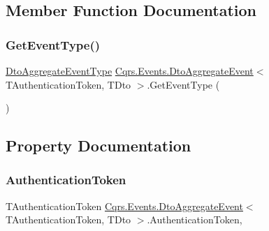 \subsection{Member Function Documentation}
\mbox{\label{classCqrs_1_1Events_1_1DtoAggregateEvent_af5bed152d656cb758312f499f87e69de_af5bed152d656cb758312f499f87e69de}} 
\subsubsection{\texorpdfstring{Get\+Event\+Type()}{GetEventType()}}
{\footnotesize\ttfamily \hyperlink{namespaceCqrs_1_1Events_a2a32e13adeac92f5a93966cd8ee2d39a_a2a32e13adeac92f5a93966cd8ee2d39a}{Dto\+Aggregate\+Event\+Type} \hyperlink{classCqrs_1_1Events_1_1DtoAggregateEvent}{Cqrs.\+Events.\+Dto\+Aggregate\+Event}$<$ T\+Authentication\+Token, T\+Dto $>$.Get\+Event\+Type (\begin{DoxyParamCaption}{ }\end{DoxyParamCaption})}



\subsection{Property Documentation}
\mbox{\label{classCqrs_1_1Events_1_1DtoAggregateEvent_a536e92af26632a9590e2ed590232cfcf_a536e92af26632a9590e2ed590232cfcf}} 
\subsubsection{\texorpdfstring{Authentication\+Token}{AuthenticationToken}}
{\footnotesize\ttfamily T\+Authentication\+Token \hyperlink{classCqrs_1_1Events_1_1DtoAggregateEvent}{Cqrs.\+Events.\+Dto\+Aggregate\+Event}$<$ T\+Authentication\+Token, T\+Dto $>$.Authentication\+Token\hspace{0.3cm}{\ttfamily [get]}, {\ttfamily [set]}}


